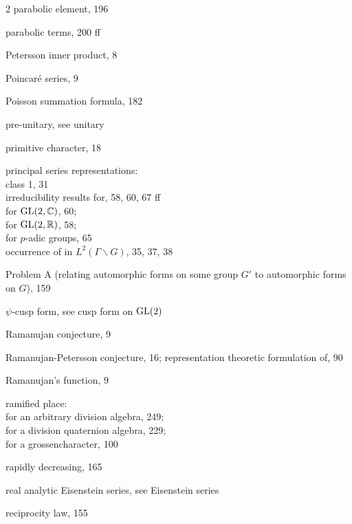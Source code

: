 \begin{multicols}{2}
\noindent parabolic element, 196\par
\noindent parabolic terms, 200 ff\par
\noindent Petersson inner product, 8\par
\noindent Poincar\'e series, 9\par
\noindent Poisson summation formula, 182\par
\noindent pre-unitary, see unitary\par
\noindent primitive character, 18\par
\noindent principal series representations:\\
\hspace*{1em}class 1, 31\\
\hspace*{1em}irreducibility results for, 58, 60, 67 ff\\
\hspace*{1em}for $\operatorname{GL}(2,\mathbb{C})$, 60;\\
\hspace*{1em}for $\operatorname{GL}(2,\mathbb{R})$, 58;\\
\hspace*{1em}for $p$-adic groups, 65\\
\hspace*{1em}occurrence of in $L^2(\Gamma\backslash G)$, 35, 37, 38\par
\noindent Problem A (relating automorphic forms on some group $G'$ to automorphic forms on $G$), 159\par
\noindent $\psi$-cusp form, see cusp form on $\operatorname{GL}(2)$\par
\noindent Ramanujan conjecture, 9\par
\noindent Ramanujan-Petersson conjecture, 16; representation theoretic formulation of, 90\par
\noindent Ramanujan's function, 9\par
\noindent ramified place:\\
\hspace*{1em}for an arbitrary division algebra, 249;\\
\hspace*{1em}for a division quaternion algebra, 229;\\
\hspace*{1em}for a grossencharacter, 100\par
\noindent rapidly decreasing, 165\par
\noindent real analytic Eisenstein series, see Eisenstein series\par
\noindent reciprocity law, 155\par

\end{multicols}
